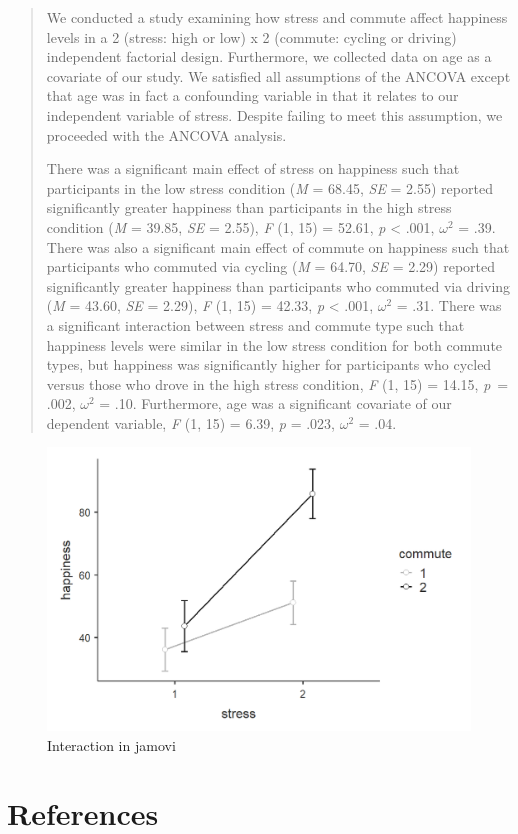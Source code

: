 \documentclass[
]{book}
\begin{document}
\begin{quote}
We conducted a study examining how stress and commute affect happiness levels in a 2 (stress: high or low) x 2 (commute: cycling or driving) independent factorial design. Furthermore, we collected data on age as a covariate of our study. We satisfied all assumptions of the ANCOVA except that age was in fact a confounding variable in that it relates to our independent variable of stress. Despite failing to meet this assumption, we proceeded with the ANCOVA analysis.

There was a significant main effect of stress on happiness such that participants in the low stress condition (\emph{M} = 68.45, \emph{SE} = 2.55) reported significantly greater happiness than participants in the high stress condition (\emph{M} = 39.85, \emph{SE} = 2.55), \emph{F} (1, 15) = 52.61, \emph{p} \textless{} .001, \(\omega^2\) = .39. There was also a significant main effect of commute on happiness such that participants who commuted via cycling (\emph{M} = 64.70, \emph{SE} = 2.29) reported significantly greater happiness than participants who commuted via driving (\emph{M} = 43.60, \emph{SE} = 2.29), \emph{F} (1, 15) = 42.33, \emph{p} \textless{} .001, \(\omega^2\) = .31. There was a significant interaction between stress and commute type such that happiness levels were similar in the low stress condition for both commute types, but happiness was significantly higher for participants who cycled versus those who drove in the high stress condition, \emph{F} (1, 15) = 14.15, \emph{p}~= .002, \(\omega^2\) = .10. Furthermore, age was a significant covariate of our dependent variable, \emph{F} (1, 15) = 6.39, \emph{p} = .023, \(\omega^2\) = .04.
\end{quote}

\begin{figure}

{\centering \includegraphics[width=1\linewidth]{images/07-ancova/ancova_interaction} 

}

\caption{Interaction in jamovi}\label{fig:unnamed-chunk-7}
\end{figure}

\hypertarget{appendix-appendices}{%
\appendix}


\hypertarget{references}{%
\chapter{References}\label{references}}

  
\end{document}
